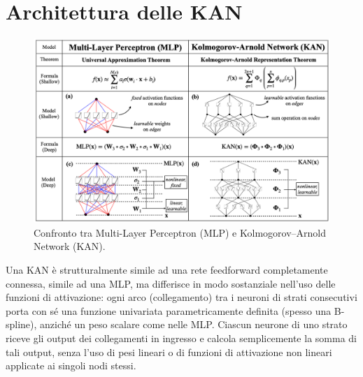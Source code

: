 \documentclass[a4paper,12pt]{report}
\begin{document}
	\section{Architettura delle KAN}
	
	\begin{figure}[H]
		\centering
		\includegraphics[width=1.0\textwidth]{img/KANvsMLP.png}
		\caption{Confronto tra Multi-Layer Perceptron (MLP) e Kolmogorov–Arnold Network (KAN).}
	\end{figure}
	Una KAN è strutturalmente simile ad una rete feedforward completamente connessa, simile ad una MLP, ma differisce in modo sostanziale nell'uso delle funzioni di attivazione: ogni arco (collegamento) tra i neuroni di strati consecutivi porta con sé una funzione univariata parametricamente definita (spesso una B-spline), anziché un peso scalare come nelle MLP. Ciascun neurone di uno strato riceve gli output dei collegamenti in ingresso e calcola semplicemente la somma di tali output, senza l’uso di pesi lineari o di funzioni di attivazione non lineari applicate ai singoli nodi stessi.
	
\end{document}

